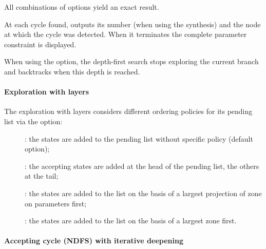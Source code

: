 All combinations of options yield an exact result.




At each cycle found, \imitator{} outputs its number (when using the synthesis) and
the node at which the cycle was detected. When it terminates the complete parameter
constraint is displayed.


When using the  option, the depth-first search stops exploring
the current branch and backtracks when this depth is reached.


\paragraph{Exploration with layers}
The exploration with layers considers different ordering policies for its pending
list via the  option:
\begin{description}
	\item[]: the states are added to the pending list
	      without specific policy	(default option);
	\item[]: the accepting states are added at
	      the head of the pending list, the others at the tail;
	\item[]: the states are added to the list on
	      the basis of a largest projection of zone on parameters first;
	\item[]: the states are added to the list on
	      the basis of a largest zone first.
\end{description}



\paragraph{Accepting cycle (NDFS) with iterative deepening}\label{sss:accepting-loop-NDFS-iterative}

